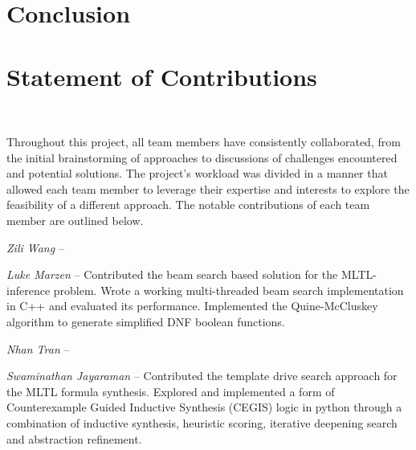 \documentclass[runningheads]{llncs}
\begin{document}
\section{Conclusion}


\section{Statement of Contributions}
\

Throughout this project, all team members have consistently collaborated, from the initial brainstorming of approaches to discussions of challenges encountered and potential solutions. The project's workload was divided in a manner that allowed each team member to leverage their expertise and interests to explore the feasibility of a different approach. The notable contributions of each team member are outlined below.



\textit{Zili Wang} -- 

\textit{Luke Marzen} -- Contributed the beam search based solution for the MLTL-inference problem. Wrote a working multi-threaded beam search implementation in C++ and evaluated its performance. Implemented the Quine-McCluskey algorithm to generate simplified DNF boolean functions.

\textit{Nhan Tran} -- 

\textit{Swaminathan Jayaraman} -- Contributed the template drive search approach for the MLTL formula synthesis. Explored and implemented a form of Counterexample Guided Inductive Synthesis (CEGIS) logic in python through a  combination of inductive synthesis, heuristic scoring, iterative deepening search and abstraction refinement.


\newpage


\end{document}
